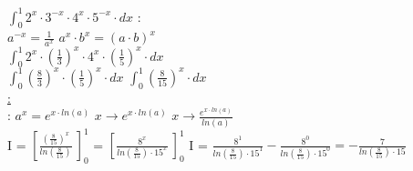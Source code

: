 \documentclass[a4paper,10pt]{article}
\begin{document}
 $\int_0^1 2^x \cdot 3^{-x} \cdot 4^x \cdot 5^{-x}\cdot dx$ : \\
 $a^{-x} = \frac{1}{a^x}$  $a^x \cdot b^x = (a \cdot b)^x $\\
 $\int_0^1 2^x \cdot \left( \frac{1}{3} \right)^x \cdot 4^x \cdot \left( \frac{1}{5} \right)^x\cdot dx$\\
 $\int_0^1 \left( \frac{8}{3} \right)^x \cdot \left( \frac{1}{5} \right)^x\cdot dx$ 
 $\int_0^1 \left( \frac{8}{15} \right)^x \cdot dx$ \\
\underline{:}\\
 : $a^x = e^{x \cdot ln(a)}$  $x \longrightarrow e^{x \cdot ln(a)} $  $ x \longrightarrow \frac{e^{x \cdot ln(a)}}{ln(a)}$\\
 I = $\left[ \frac{\left( \frac{8}{15} \right)^x}{ln(\frac{8}{15})} \ \right]_0^1$ = $\left[ \frac{8^x}{ln(\frac{8}{15}) \cdot 15^x} \ \right]_0^1$ 
 I = $\frac{8^1}{ln(\frac{8}{15}) \cdot 15^1} - \frac{8^0}{ln(\frac{8}{15}) \cdot 15^0} = - \frac{7}{ln(\frac{8}{15}) \cdot 15}$ \\
\end{document}
